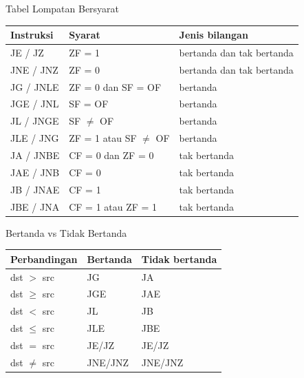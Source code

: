 \documentclass[aspectratio=169,11pt]{beamer}
\begin{document}
\begin{frame}{Tabel Lompatan Bersyarat}
\scriptsize
\begin{center}
\begin{tabular}{@{}>{\raggedright\arraybackslash}p{3.0cm}
    >{\raggedright\arraybackslash}p{4.2cm}
    >{\raggedright\arraybackslash}p{5.6cm}@{}}
    \toprule
    \textbf{Instruksi} & \textbf{Syarat} & \textbf{Jenis bilangan} \\
    \midrule
    JE / JZ & ZF = 1 & bertanda dan tak bertanda \\
    \addlinespace
    JNE / JNZ & ZF = 0 & bertanda dan tak bertanda \\
    \addlinespace
    JG / JNLE & ZF = 0 dan SF = OF & bertanda \\
    \addlinespace
    JGE / JNL & SF = OF & bertanda \\
    \addlinespace
    JL / JNGE & SF $\neq$ OF & bertanda \\
    \addlinespace
    JLE / JNG & ZF = 1 atau SF $\neq$ OF & bertanda \\
    \addlinespace
    JA / JNBE & CF = 0 dan ZF = 0 & tak bertanda \\
    \addlinespace
    JAE / JNB & CF = 0 & tak bertanda \\
    \addlinespace
    JB / JNAE & CF = 1 & tak bertanda \\
    \addlinespace
    JBE / JNA & CF = 1 atau ZF = 1 & tak bertanda \\
    \bottomrule
\end{tabular}
\end{center}
\end{frame}

\begin{frame}{Bertanda vs Tidak Bertanda}
\footnotesize
\begin{center}
\begin{tabular}{@{}>{\raggedright\arraybackslash}p{3.8cm}
    >{\raggedright\arraybackslash}p{4.4cm}
    >{\raggedright\arraybackslash}p{4.6cm}@{}}
    \toprule
    \textbf{Perbandingan} & \textbf{Bertanda} &
    \textbf{Tidak bertanda} \\
    \midrule
    dst $>$ src & JG & JA \\
    \addlinespace
    dst $\geq$ src & JGE & JAE \\
    \addlinespace
    dst $<$ src & JL & JB \\
    \addlinespace
    dst $\leq$ src & JLE & JBE \\
    \addlinespace
    dst $=$ src & JE/JZ & JE/JZ \\
    \addlinespace
    dst $\neq$ src & JNE/JNZ & JNE/JNZ \\
    \bottomrule
\end{tabular}
\end{center}
\end{frame}
\end{document}
